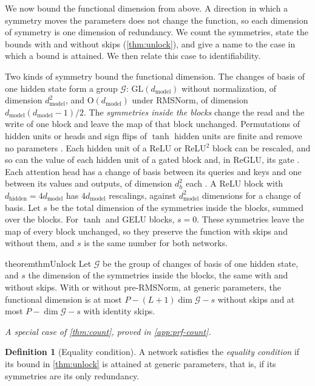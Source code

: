 \documentclass[10pt]{article}
\theoremstyle{definition}
\newtheorem{definition}[theorem]{Definition}
\theoremstyle{remark}
\newcommand{\dm}{d_{\mathrm{model}}}
\newcommand{\dhid}{d_{\mathrm{hidden}}}
\newcommand{\GL}{\mathrm{GL}}
\newcommand{\Ort}{\mathrm{O}}
\newcommand{\G}{\mathcal{G}}
\newcommand{\specialof}[2]{\par\vspace{-0.4\baselineskip}\noindent\hfill{\small\itshape A special case of \cref{#1}, proved in \cref{#2}.}\par\smallskip}
\begin{document}
We now bound the functional dimension from above. A direction in which a symmetry moves the parameters does not change the function, so each dimension of symmetry is one dimension of redundancy. We count the symmetries, state the bounds with and without skips (\cref{thm:unlock}), and give a name to the case in which a bound is attained. We then relate this case to identifiability.

Two kinds of symmetry bound the functional dimension. The changes of basis of one hidden state form a group $\G$: $\GL(\dm)$ without normalization, of dimension $\dm^2$, and $\Ort(\dm)$ under RMSNorm, of dimension $\dm(\dm-1)/2$. The \emph{symmetries inside the blocks} change the read and the write of one block and leave the map of that block unchanged. Permutations of hidden units or heads and sign flips of $\tanh$ hidden units are finite and remove no parameters \citep{sussmann1992,fefferman1994}. Each hidden unit of a ReLU or ReLU$^2$ block can be rescaled, and so can the value of each hidden unit of a gated block and, in ReGLU, its gate \citep{rolnick2020reverse,godfrey2022symmetries}. Each attention head has a change of basis between its queries and keys and one between its values and outputs, of dimension $d_h^2$ each \citep{elhage2021circuits,wang2025gauge,theus2025glmc}. A ReLU block with $\dhid = 4\dm$ has $4\dm$ rescalings, against $\dm^2$ dimensions for a change of basis. Let $s$ be the total dimension of the symmetries inside the blocks, summed over the blocks. For $\tanh$ and GELU blocks, $s = 0$. These symmetries leave the map of every block unchanged, so they preserve the function with skips and without them, and $s$ is the same number for both networks.

\begin{restatable}{theorem}{thmUnlock}\label{thm:unlock}
Let $\G$ be the group of changes of basis of one hidden state, and $s$ the dimension of the symmetries inside the blocks, the same with and without skips. With or without pre-RMSNorm, at generic parameters, the functional dimension is at most $P - (L+1)\dim\G - s$ without skips and at most $P - \dim\G - s$ with identity skips.
\end{restatable}
\specialof{thm:count}{app:prf-count}

\begin{definition}[Equality condition]\label{def:equality}
A network satisfies the \emph{equality condition} if its bound in \cref{thm:unlock} is attained at generic parameters, that is, if its symmetries are its only redundancy.
\end{definition}
\end{document}

